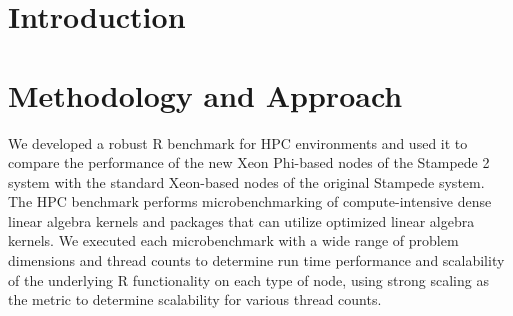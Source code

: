 \section{Introduction}


\section{Methodology and Approach}
We developed a robust R benchmark for HPC environments and used it to
  compare the performance of the new Xeon Phi-based nodes of the Stampede 2
  system with the standard Xeon-based nodes of the original Stampede system.
The HPC benchmark performs microbenchmarking of compute-intensive dense linear
  algebra kernels and packages that can utilize optimized linear algebra
  kernels.
We executed each microbenchmark with a wide range of problem dimensions and
  thread counts to determine run time performance and scalability of the
  underlying R functionality on each type of node, using strong scaling as the
  metric to determine scalability for various thread counts.
